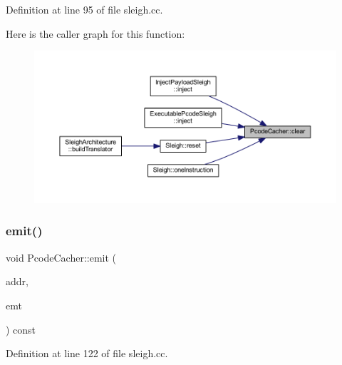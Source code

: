 Definition at line 95 of file sleigh.\+cc.

Here is the caller graph for this function\+:
\nopagebreak
\begin{figure}[H]
\begin{center}
\leavevmode
\includegraphics[width=350pt]{class_pcode_cacher_afa7aaee06ffc63d4200619c52728181e_icgraph}
\end{center}
\end{figure}
\mbox{\label{class_pcode_cacher_a75c21a233c9eef255c53a498790882fc}} 
\subsubsection{\texorpdfstring{emit()}{emit()}}
{\footnotesize\ttfamily void Pcode\+Cacher\+::emit (\begin{DoxyParamCaption}\item[{const \mbox{\hyperlink{class_address}{Address}} \&}]{addr,  }\item[{\mbox{\hyperlink{class_pcode_emit}{Pcode\+Emit}} $\ast$}]{emt }\end{DoxyParamCaption}) const}



Definition at line 122 of file sleigh.\+cc.

